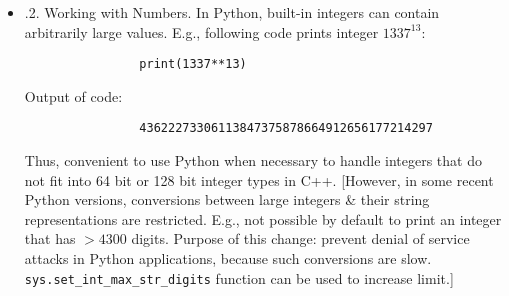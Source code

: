 \documentclass{article}
\begin{document}
\begin{itemize}
\begin{itemize}
\begin{itemize}
			\begin{verbatim}
				print(a, b, c, sep="\n")
			\end{verbatim}
			\item {.2. Working with Numbers.} In Python, built-in integers can contain arbitrarily large values. E.g., following code prints integer $1337^{13}$:
			\begin{verbatim}
				print(1337**13)
			\end{verbatim}
			Output of code:
			\begin{verbatim}
				43622273306113847375878664912656177214297
			\end{verbatim}
			Thus, convenient to use Python when necessary to handle integers that do not fit into 64 bit or 128 bit integer types in C++. [However, in some recent Python versions, conversions between large integers \& their string representations are restricted. E.g., not possible by default to print an integer that has $> 4300$ digits. Purpose of this change: prevent denial of service attacks in Python applications, because such conversions are slow. \verb|sys.set_int_max_str_digits| function can be used to increase limit.]
			

\end{itemize}
\end{itemize}
\end{itemize}
\end{document}

